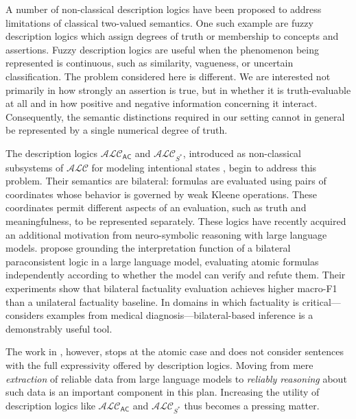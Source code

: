 \documentclass[letterpaper]{article}
\begin{document}
A number of non-classical description logics have been proposed to address limitations of classical two-valued semantics. One such example are fuzzy description logics \cite{DBLP:conf/aaai/Straccia98,DBLP:conf/sum/BorgwardtP17} which assign degrees of truth or membership to concepts and assertions. Fuzzy description logics are useful when the phenomenon being represented is continuous, such as similarity, vagueness, or uncertain classification. The problem considered here is different. We are interested not primarily in how strongly an assertion is true, but in whether it is truth-evaluable at all and in how positive and negative information concerning it interact. Consequently, the semantic distinctions required in our setting cannot in general be represented by a single numerical degree of truth.

The description logics $\mathcal{ALC}_\mathsf{AC}$ and $\mathcal{ALC}_{S^\ast}$, introduced as non-classical subsystems of $\mathcal{ALC}$ for modeling intentional states \cite{DBLP:conf/dlog/Ferguson21}, begin to address this problem. Their semantics are bilateral: formulas are evaluated using pairs of coordinates whose behavior is governed by weak Kleene operations. These coordinates permit different aspects of an evaluation, such as truth and meaningfulness, to be represented separately. These logics have recently acquired an additional motivation from neuro-symbolic reasoning with large language models. \cite{DBLP:conf/nesy/AllenCFIG25} propose grounding the interpretation function of a bilateral paraconsistent logic in a large language model, evaluating atomic formulas independently according to whether the model can verify and refute them. Their experiments show that bilateral factuality evaluation achieves higher macro-F1 than a unilateral factuality baseline. In domains in which factuality is critical---\cite{DBLP:conf/nesy/AllenCFIG25} considers examples from medical diagnosis---bilateral-based inference is a demonstrably useful tool.

The work in \cite{DBLP:conf/nesy/AllenCFIG25}, however, stops at the atomic case and does not consider sentences with the full expressivity offered by description logics. Moving from mere \emph{extraction} of reliable data from large language models to \emph{reliably reasoning} about such data is an important component in this plan. Increasing the utility of description logics like $\mathcal{ALC}_\mathsf{AC}$ and $\mathcal{ALC}_{S^\ast}$ thus becomes a pressing matter. 
\end{document}
